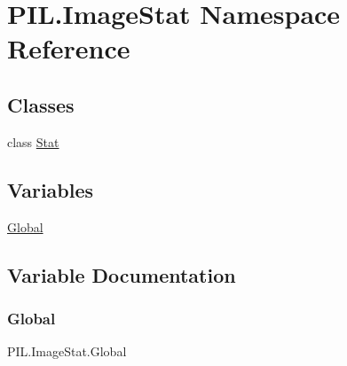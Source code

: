 \hypertarget{namespacePIL_1_1ImageStat}{}\section{P\+I\+L.\+Image\+Stat Namespace Reference}
\label{namespacePIL_1_1ImageStat}
\subsection*{Classes}
\begin{DoxyCompactItemize}
\item 
class \hyperlink{classPIL_1_1ImageStat_1_1Stat}{Stat}
\end{DoxyCompactItemize}
\subsection*{Variables}
\begin{DoxyCompactItemize}
\item 
\hyperlink{namespacePIL_1_1ImageStat_a64cde436a8e4cfcb6ac5bf007d93dcf5}{Global}
\end{DoxyCompactItemize}


\subsection{Variable Documentation}
\mbox{\label{namespacePIL_1_1ImageStat_a64cde436a8e4cfcb6ac5bf007d93dcf5}} 
\subsubsection{\texorpdfstring{Global}{Global}}
{\footnotesize\ttfamily P\+I\+L.\+Image\+Stat.\+Global}

